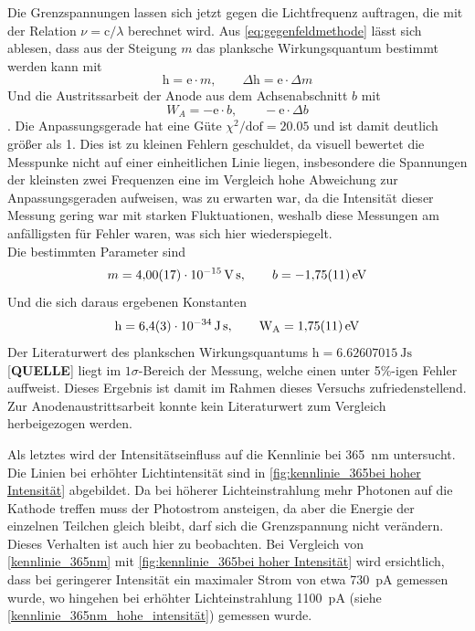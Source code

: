 Die Grenzspannungen lassen sich jetzt gegen die Lichtfrequenz auftragen, die mit
der Relation $\nu = \mathrm c / \lambda$ berechnet wird. Aus \cref{eq:gegenfeldmethode} lässt sich
ablesen, dass aus der Steigung $m$ das planksche Wirkungsquantum bestimmt werden kann mit
\begin{equation}
	\mathrm h = \mathrm e \cdot m,\qquad \Delta\mathrm h = \mathrm e \cdot \Delta m \nonumber
\end{equation}
Und die Austritssarbeit der Anode aus dem Achsenabschnitt $b$ mit
\begin{equation}
	W_A = -\mathrm e \cdot b, \qquad -\mathrm e \cdot \Delta b \nonumber
\end{equation}
. Die Anpassungsgerade hat eine Güte $\chi^2/\mathrm{dof} = \num{20.05}$ und ist damit deutlich größer als
\num{1}. Dies ist zu kleinen Fehlern geschuldet, da visuell bewertet die Messpunke nicht auf einer 
einheitlichen Linie liegen, insbesondere die Spannungen der kleinsten zwei Frequenzen eine im Vergleich 
hohe Abweichung zur Anpassungsgeraden aufweisen, was zu erwarten war, da die Intensität 
dieser Messung gering war mit starken Fluktuationen, weshalb diese Messungen 
am anfälligsten für Fehler waren, was sich hier wiederspiegelt.\\
Die bestimmten Parameter sind 
\[m = \SI{4.00(17)e-15}{\volt\second},\qquad b = -\SI{1.75\pm .11}{\electronvolt}\]
Und die sich daraus ergebenen Konstanten 
\[\mathrm h = \SI{6.4(3)e-34}{\joule\second}, \qquad \mathrm W_{\mathrm A} = \SI{1.75\pm .11}{\electronvolt}\]
Der Literaturwert des plankschen Wirkungsquantums $\mathrm h = \SI{6.62607015}{\joule\second}$[\textbf{QUELLE}]
liegt im $1\sigma$-Bereich der Messung, welche einen unter 5\%-igen Fehler auffweist. 
Dieses Ergebnis ist damit im Rahmen dieses Versuchs zufriedenstellend.
Zur Anodenaustrittsarbeit konnte kein Literaturwert zum Vergleich herbeigezogen werden.\\\par



Als letztes wird der Intensitätseinfluss auf die Kennlinie bei \SI{365}{\nano\meter}
untersucht. Die Linien bei erhöhter Lichtintensität sind in \cref{fig:kennlinie_365bei hoher Intensität}
abgebildet. Da bei höherer Lichteinstrahlung mehr Photonen 
auf die Kathode treffen muss der Photostrom ansteigen, da 
aber die Energie der einzelnen Teilchen gleich bleibt, darf sich 
die Grenzspannung nicht verändern.\\
Dieses Verhalten ist auch hier zu beobachten. Bei Vergleich von \cref{kennlinie_365nm} mit 
\cref{fig:kennlinie_365bei hoher Intensität} wird ersichtlich, dass
bei geringerer Intensität ein maximaler Strom von etwa \SI{730}{\pico\ampere} gemessen
wurde, wo hingehen bei erhöhter Lichteinstrahlung \SI{1100}{\pico\ampere} (siehe 
\cref{kennlinie_365nm_hohe_intensität})
gemessen wurde.\\

